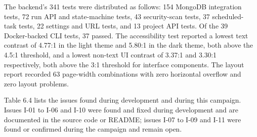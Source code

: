 \documentclass[12pt,a4paper,oneside]{report}
\begin{document}
\endgroup

The backend's 341 tests were distributed as follows: 154 MongoDB integration tests, 72 run API and state-machine tests, 43 security-scan tests, 37 scheduled-task tests, 22 settings and URL tests, and 13 project API tests. Of the 39 Docker-backed CLI tests, 37 passed. The accessibility test reported a lowest text contrast of 4.77:1 in the light theme and 5.80:1 in the dark theme, both above the 4.5:1 threshold, and a lowest non-text UI contrast of 3.37:1 and 3.30:1 respectively, both above the 3:1 threshold for interface components. The layout report recorded 63 page-width combinations with zero horizontal overflow and zero layout problems.

Table 6.4 lists the issues found during development and during this campaign. Issues I-01 to I-06 and I-10 were found and fixed during development and are documented in the source code or README; issues I-07 to I-09 and I-11 were found or confirmed during the campaign and remain open.

\begingroup\small
\end{document}
